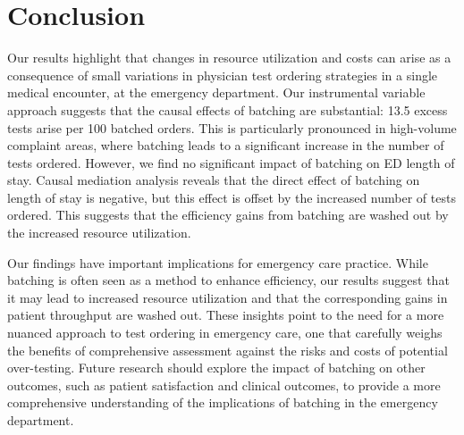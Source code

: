 \documentclass[,,nonblindrev]{informs}
\begin{document}
\hypertarget{conclusion}{%
\section{Conclusion}\label{conclusion}}

Our results highlight that changes in resource utilization and costs can
arise as a consequence of small variations in physician test ordering
strategies in a single medical encounter, at the emergency department.
Our instrumental variable approach suggests that the causal effects of
batching are substantial: 13.5 excess tests arise per 100 batched
orders. This is particularly pronounced in high-volume complaint areas,
where batching leads to a significant increase in the number of tests
ordered. However, we find no significant impact of batching on ED length
of stay. Causal mediation analysis reveals that the direct effect of
batching on length of stay is negative, but this effect is offset by the
increased number of tests ordered. This suggests that the efficiency
gains from batching are washed out by the increased resource
utilization.

Our findings have important implications for emergency care practice.
While batching is often seen as a method to enhance efficiency, our
results suggest that it may lead to increased resource utilization and
that the corresponding gains in patient throughput are washed out. These
insights point to the need for a more nuanced approach to test ordering
in emergency care, one that carefully weighs the benefits of
comprehensive assessment against the risks and costs of potential
over-testing. Future research should explore the impact of batching on
other outcomes, such as patient satisfaction and clinical outcomes, to
provide a more comprehensive understanding of the implications of
batching in the emergency department.

\clearpage
\end{document}
